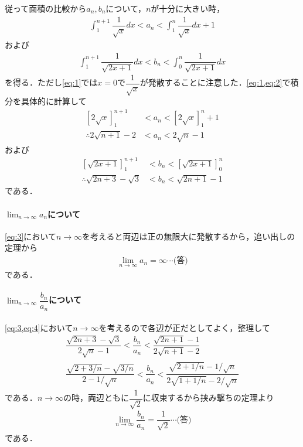 \documentclass[../../main.tex]{subfiles}
\begin{document}
従って面積の比較から$a_n,b_n$について，$n$が十分に大きい時，
\begin{align}
  \int_{1}^{n+1}\dfrac{1}{\sqrt{x}}dx < a_n < \int_{1}^{n}\dfrac{1}{\sqrt{x}}dx+1 \label{eq:1}
\end{align}
および
\begin{align}
  \int_{1}^{n+1}\dfrac{1}{\sqrt{2x+1}}dx < b_n < \int_{0}^{n}\dfrac{1}{\sqrt{2x+1}}dx \label{eq:2}
\end{align}
を得る．ただし\cref{eq:1}では$x=0$で$\dfrac{1}{\sqrt{x}}$が発散することに注意した．\cref{eq:1,eq:2}で積分を具体的に計算して
\begin{align}
  \left[2\sqrt{x}\right]_{1}^{n+1} &< a_n < \left[2\sqrt{x}\right]_{1}^{n}+1 \\
  \therefore
  2\sqrt{n+1} - 2 &< a_n < 2\sqrt{n} - 1 \label{eq:3}
\end{align}
および
\begin{align}
  \left[\sqrt{2x+1}\right]_{1}^{n+1} &< b_n < \left[\sqrt{2x+1}\right]_{0}^{n} \\
  \therefore
  \sqrt{2n+3} - \sqrt{3} &< b_n < \sqrt{2n+1} - 1 \label{eq:4}
\end{align}
である．

\paragraph{$\lim_{n\to\infty}a_n$について}

\cref{eq:3}において$n\to\infty$を考えると両辺は正の無限大に発散するから，追い出しの定理から
\begin{align}
  \lim_{n\to\infty}a_n = \infty \cdots\text{(答)}
\end{align}
である．

\paragraph{$\lim_{n\to\infty} \dfrac{b_n}{a_n}$について}

\cref{eq:3,eq:4}において$n\to\infty$を考えるので各辺が正だとしてよく，整理して
\begin{align}
  \dfrac{\sqrt{2n+3} - \sqrt{3}}{2\sqrt{n} - 1} < \dfrac{b_n}{a_n} < \dfrac{\sqrt{2n+1} - 1}{2\sqrt{n+1} - 2} \\
  \dfrac{\sqrt{2+3/n} - \sqrt{3/n}}{2 - 1/\sqrt{n}} < \dfrac{b_n}{a_n} < \dfrac{\sqrt{2+1/n} - 1/\sqrt{n}}{2\sqrt{1+1/n} - 2/\sqrt{n}}
\end{align}
である．$n\to\infty$の時，両辺ともに$\dfrac{1}{\sqrt{2}}$に収束するから挟み撃ちの定理より
\begin{align}
  \lim_{n\to\infty} \dfrac{b_n}{a_n} = \dfrac{1}{\sqrt{2}} \cdots\text{(答)}
\end{align}
である．

\newpage
\end{document}
